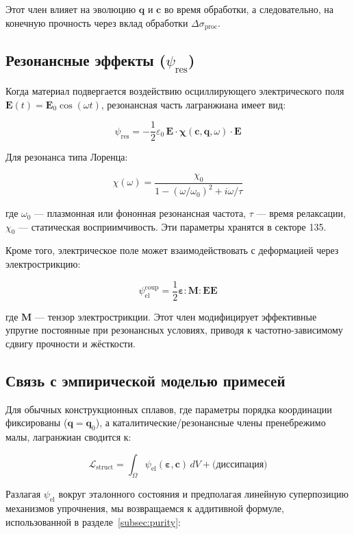 \documentclass[12pt,a4paper]{article}
\begin{document}
	Этот член влияет на эволюцию \(\mathbf{q}\) и \(\mathbf{c}\) во время обработки, а следовательно, на конечную прочность через вклад обработки \(\Delta\sigma_{\mathrm{proc}}\).
	
	\subsection{Резонансные эффекты (\(\psi_{\mathrm{res}}\))}
	\label{subsec:resonance}
	
	Когда материал подвергается воздействию осциллирующего электрического поля \(\mathbf{E}(t) = \mathbf{E}_0 \cos(\omega t)\), резонансная часть лагранжиана имеет вид:
	
	\[
	\psi_{\mathrm{res}} = -\frac{1}{2}\varepsilon_0\, \mathbf{E} \cdot \boldsymbol{\chi}(\mathbf{c}, \mathbf{q}, \omega) \cdot \mathbf{E}
	\]
	
	Для резонанса типа Лоренца:
	
	\[
	\chi(\omega) = \frac{\chi_0}{1 - (\omega/\omega_0)^2 + i\omega/\tau}
	\]
	
	где \(\omega_0\) — плазмонная или фононная резонансная частота, \(\tau\) — время релаксации, \(\chi_0\) — статическая восприимчивость. Эти параметры хранятся в секторе 135.
	
	Кроме того, электрическое поле может взаимодействовать с деформацией через электрострикцию:
	
	\[
	\psi_{\mathrm{el}}^{\mathrm{coup}} = \frac{1}{2} \boldsymbol{\varepsilon} : \mathbf{M} : \mathbf{E}\mathbf{E}
	\]
	
	где \(\mathbf{M}\) — тензор электрострикции. Этот член модифицирует эффективные упругие постоянные при резонансных условиях, приводя к частотно-зависимому сдвигу прочности и жёсткости.
	
	\subsection{Связь с эмпирической моделью примесей}
	\label{subsec:relation-empirical}
	
	Для обычных конструкционных сплавов, где параметры порядка координации фиксированы (\(\mathbf{q} = \mathbf{q}_0\)), а каталитические/резонансные члены пренебрежимо малы, лагранжиан сводится к:
	
	\[
	\mathcal{L}_{\mathrm{struct}} = \int_{\Omega} \psi_{\mathrm{el}}(\boldsymbol{\varepsilon}, \mathbf{c}) \, dV + \text{(диссипация)}
	\]
	
	Разлагая \(\psi_{\mathrm{el}}\) вокруг эталонного состояния и предполагая линейную суперпозицию механизмов упрочнения, мы возвращаемся к аддитивной формуле, использованной в разделе~\ref{subsec:purity}:
	
\end{document}
